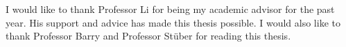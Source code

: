 I would like to thank Professor Li for being my academic advisor for the past year.  His support and advice has made this thesis possible.  I would also like to thank Professor Barry and Professor St\"uber for reading this thesis.